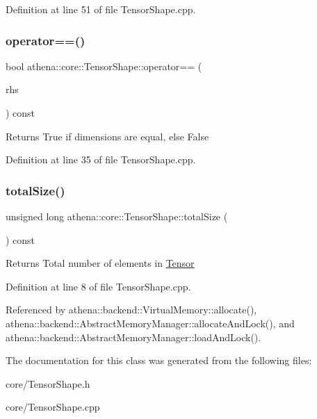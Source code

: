 Definition at line 51 of file Tensor\+Shape.\+cpp.

\mbox{\label{classathena_1_1core_1_1_tensor_shape_aa42737e3e51e76507bb60791889d4d9b}} 
\subsubsection{\texorpdfstring{operator==()}{operator==()}}
{\footnotesize\ttfamily bool athena\+::core\+::\+Tensor\+Shape\+::operator== (\begin{DoxyParamCaption}\item[{const \mbox{\hyperlink{classathena_1_1core_1_1_tensor_shape}{Tensor\+Shape}} \&}]{rhs }\end{DoxyParamCaption}) const}

\begin{DoxyReturn}{Returns}
True if dimensions are equal, else False 
\end{DoxyReturn}


Definition at line 35 of file Tensor\+Shape.\+cpp.

\mbox{\label{classathena_1_1core_1_1_tensor_shape_a81219fb0b0e3e6852cb02fbbcf059882}} 
\subsubsection{\texorpdfstring{total\+Size()}{totalSize()}}
{\footnotesize\ttfamily unsigned long athena\+::core\+::\+Tensor\+Shape\+::total\+Size (\begin{DoxyParamCaption}{ }\end{DoxyParamCaption}) const}

\begin{DoxyReturn}{Returns}
Total number of elements in \mbox{\hyperlink{classathena_1_1core_1_1_tensor}{Tensor}} 
\end{DoxyReturn}


Definition at line 8 of file Tensor\+Shape.\+cpp.



Referenced by athena\+::backend\+::\+Virtual\+Memory\+::allocate(), athena\+::backend\+::\+Abstract\+Memory\+Manager\+::allocate\+And\+Lock(), and athena\+::backend\+::\+Abstract\+Memory\+Manager\+::load\+And\+Lock().



The documentation for this class was generated from the following files\+:\begin{DoxyCompactItemize}
\item 
core/Tensor\+Shape.\+h\item 
core/Tensor\+Shape.\+cpp\end{DoxyCompactItemize}
